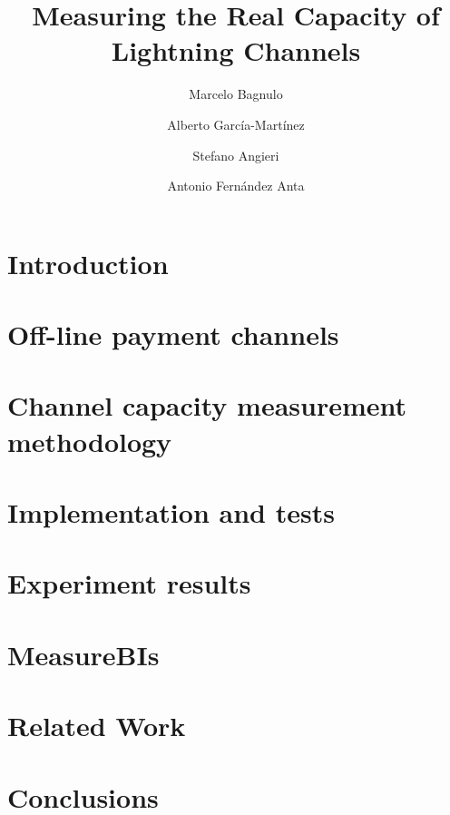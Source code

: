 \documentclass[journal]{IEEEtran}
\begin{document}
 
\title{Measuring the Real Capacity of Lightning Channels}
 \author[1]{Marcelo Bagnulo} 
 \author[1]{Alberto  Garc\'{i}a-Mart\'{i}nez}
 \author[1]{Stefano Angieri}
 \author[2]{Antonio Fern\'{a}ndez Anta}
 \renewcommand\Authands{ and }
 
 \maketitle


%


\section{Introduction}


\section{Off-line payment channels}


\section{Channel capacity measurement methodology}


\section{Implementation and tests}


\section{Experiment results}


\section{MeasureBIs}


\section{Related Work}


\section{Conclusions}


\small


 
\end{document}
